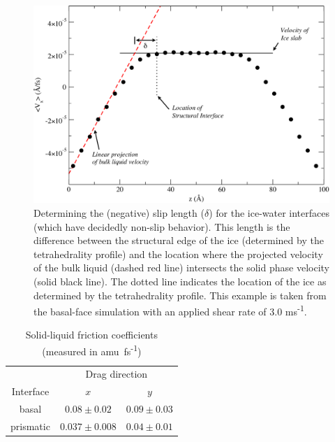 \begin{figure}
\includegraphics[width=\linewidth]{Figures/delta_example}
\caption{\label{fig:delta_example} Determining the (negative) slip
  length ($\delta$) for the ice-water interfaces (which have decidedly
  non-slip behavior).  This length is the difference between the
  structural edge of the ice (determined by the tetrahedrality
  profile) and the location where the projected velocity of the bulk
  liquid (dashed red line) intersects the solid phase velocity (solid
  black line).  The dotted line indicates the location of the ice as
  determined by the tetrahedrality profile.  This example is taken
  from the basal-face simulation with an applied shear rate of 3.0 ms\textsuperscript{-1}.}
\end{figure}


\begin{table}[h]
\centering
\caption{Solid-liquid friction coefficients (measured in amu~fs\textsuperscript{-1}) }
\label{tab:lambda}
\begin{tabular}{|ccc|}  \hline
           & \multicolumn{2}{c|}{Drag direction} \\ 
 Interface & $x$               & $y$  \\ \hline
     basal &  $0.08 \pm 0.02$  & $0.09 \pm 0.03$ \\
 prismatic & $0.037 \pm 0.008$ & $0.04 \pm 0.01$ \\ \hline
\end{tabular}
\end{table}


